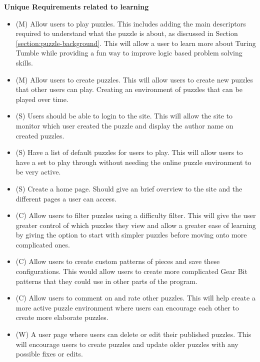 \documentclass{l4proj}
\begin{document}
\textbf{Unique Requirements related to learning}
\begin{itemize}
    \item (M) Allow users to play puzzles. This includes adding the main descriptors required to understand what the puzzle is about, as discussed in Section \ref{section:puzzle-background}. This will allow a user to learn more about Turing Tumble while providing a fun way to improve logic based problem solving skills.
    \item (M) Allow users to create puzzles. This will allow users to create new puzzles that other users can play. Creating an environment of puzzles that can be played over time.
    \item (S) Users should be able to login to the site. This will allow the site to monitor which user created the puzzle and display the author name on created puzzles.
    \item (S) Have a list of default puzzles for users to play. This will allow users to have a set to play through without needing the online puzzle environment to be very active.
    \item (S) Create a home page. Should give an brief overview to the site and the different pages a user can access.
    \item (C) Allow users to filter puzzles using a difficulty filter. This will give the user greater control of which puzzles they view and allow a greater ease of learning by giving the option to start with simpler puzzles before moving onto more complicated ones.
    \item (C) Allow users to create custom patterns of pieces and save these configurations. This would allow users to create more complicated Gear Bit patterns that they could use in other parts of the program.
    \item (C) Allow users to comment on and rate other puzzles. This will help create a more active puzzle environment where users can encourage each other to create more elaborate puzzles.
    \item (W) A user page where users can delete or edit their published puzzles. This will encourage users to create puzzles and update older puzzles with any possible fixes or edits.
\end{itemize}
\end{document}
